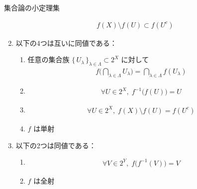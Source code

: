 \documentclass[geometry_main]{subfiles}
\begin{document}
\begin{mylem}[label=lem:sets,breakable]{集合論の小定理集}
\begin{enumerate}
\begin{align}
			f(X) \setminus f(U) \subset f(U^c)
		\end{align}
        \item 以下の4つは互いに同値である：
        \begin{enumerate}
            \item 任意の集合族 $\bigl\{\, U_\lambda \, \bigr\}_{\lambda \in \Lambda} \subset 2^X$ に対して
            \begin{align}
                f \Biggl(\bigcap_{\lambda \in \Lambda} U_\lambda\Biggr) = \bigcap_{\lambda \in \Lambda} f(U_\lambda)
            \end{align}
            \item \begin{align}
                \forall U \in 2^X,\; f^{-1}\bigl( f(U) \bigr) = U
            \end{align}
            \item \begin{align}
                \forall U \in 2^X,\; f(X) \setminus f(U) = f(U^c)
            \end{align}
            \item $f$ は単射
        \end{enumerate}
        \item 以下の2つは同値である：
        \begin{enumerate}
            \item 
            \begin{align}
                \forall V \in 2^Y,\; f \bigl( f^{-1}(V) \bigr) = V
            \end{align}
            \item $f$ は全射
        \end{enumerate}
	\end{enumerate}
\end{mylem}
\end{document}
